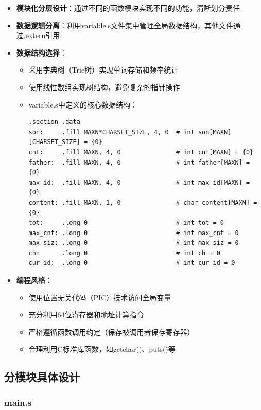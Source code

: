 \documentclass[10pt,a4paper]{article}
\begin{document}
\begin{itemize}
    \item \textbf{模块化分层设计}：通过不同的函数模块实现不同的功能，清晰划分责任
    \item \textbf{数据逻辑分离}：利用variable.s文件集中管理全局数据结构，其他文件通过.extern引用
    \item \textbf{数据结构选择}：
    \begin{itemize}
        \item 采用字典树（Trie树）实现单词存储和频率统计
        \item 使用线性数组实现树结构，避免复杂的指针操作
        \item variable.s中定义的核心数据结构：
        \begin{lstlisting}[language={[x86masm]Assembler}]
.section .data
son:     .fill MAXN*CHARSET_SIZE, 4, 0  # int son[MAXN][CHARSET_SIZE] = {0}
cnt:     .fill MAXN, 4, 0               # int cnt[MAXN] = {0}
father:  .fill MAXN, 4, 0               # int father[MAXN] = {0}
max_id:  .fill MAXN, 4, 0               # int max_id[MAXN] = {0}
content: .fill MAXN, 1, 0               # char content[MAXN] = {0}
tot:     .long 0                        # int tot = 0
max_cnt: .long 0                        # int max_cnt = 0
max_siz: .long 0                        # int max_siz = 0
ch:      .long 0                        # int ch = 0
cur_id:  .long 0                        # int cur_id = 0
        \end{lstlisting}
    \end{itemize}
    \item \textbf{编程风格}：
    \begin{itemize}
        \item 使用位置无关代码（PIC）技术访问全局变量
        \item 充分利用64位寄存器和地址计算指令
        \item 严格遵循函数调用约定（保存被调用者保存寄存器）
        \item 合理利用C标准库函数，如getchar()、puts()等
    \end{itemize}
\end{itemize}

\subsection{分模块具体设计}

\subsubsection{main.s}
\end{document}
